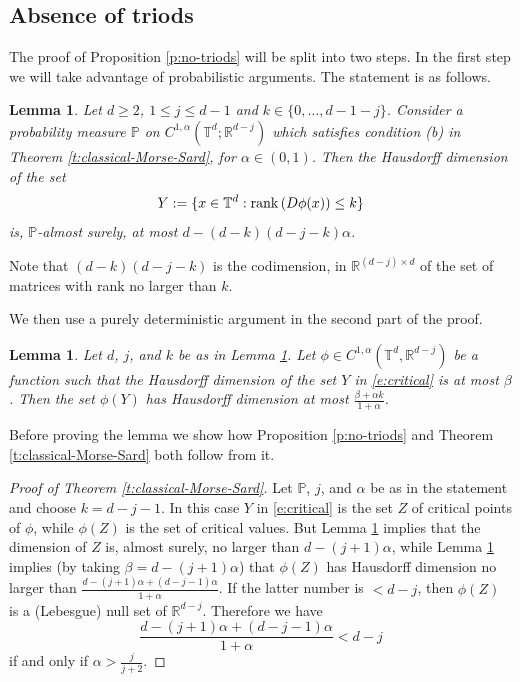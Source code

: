 \documentclass[11pt,reqno]{amsart}
\newtheorem{lemma}[theorem]{Lemma}
\theoremstyle{definition}
\numberwithin{equation}{section}
\begin{document}
\subsection{Absence of triods}\label{s:dimension-estimate}

The proof of Proposition \ref{p:no-triods} will be split into two steps. In the first step we will take advantage of  probabilistic arguments. The statement is as follows.

\begin{lemma}\label{l:probabilistic} Let $d\geq 2$, $1\leq j \leq d-1$ and $k\in \{0, \ldots , d-1-j\}$. 
Consider a probability measure $\mathbb P$ on $C^{1,\alpha} (\mathbb{T}^d; \mathbb{R}^{d-j})$ which satisfies condition (b) in Theorem \ref{t:classical-Morse-Sard}, for $\alpha \in (0,1)$. Then the Hausdorff dimension of the set 
\begin{equation}\label{e:critical}
Y := \{ x \in \mathbb{T}^d : {\rm rank}\, (D\phi (x)) \leq k\}
\end{equation}
is, $\mathbb P$-almost surely, at most $d-(d-k)(d-j-k)\alpha$.
\end{lemma}

Note that $(d-k)(d-j-k)$ is the codimension, in $\mathbb R^{(d-j)\times d}$ of the set of matrices with rank no larger than $k$.

We then use a purely deterministic argument in the second part of the proof.

\begin{lemma}\label{l:deterministic} Let $d$, $j$, and $k$ be as in Lemma \ref{l:probabilistic}.
Let $\phi \in C^{1,\alpha} (\mathbb T^d, \mathbb R^{d-j})$ be a function such that the Hausdorff dimension of 
the set $Y$ in \eqref{e:critical} is at most $\beta$. Then the set $\phi (Y)$ has Hausdorff dimension at most $\frac{\beta +\alpha k}{1+\alpha}$. 
\end{lemma}

Before proving the lemma we show how Proposition \ref{p:no-triods} and Theorem \ref{t:classical-Morse-Sard} both follow from it.

\begin{proof}[Proof of Theorem \ref{t:classical-Morse-Sard}]
Let $\mathbb P$, $j$, and $\alpha$ be as in the statement and 
choose $k=d-j-1$. In this case $Y$ in \eqref{e:critical} is the set $Z$ of critical points of $\phi$, while $\phi (Z)$ is the set of critical values. But Lemma \ref{l:probabilistic} implies that the dimension of $Z$ is, almost surely, no larger than $d-(j+1)\alpha$, while Lemma \ref{l:deterministic} implies (by taking $\beta = d - (j+1) \alpha$) that $\phi (Z)$ has Hausdorff dimension no larger than $\frac{d- (j+1)\alpha + (d-j-1)\alpha}{1+\alpha}$. If the latter number is $<d-j$, then $\phi (Z)$ is a (Lebesgue) null set of $\mathbb R^{d-j}$. Therefore we have 
\[
\frac{d-(j+1) \alpha + (d-j-1)\alpha}{1+\alpha} < d-j
\]
if and only if $\alpha > \frac{j}{j+2}$.
\end{proof}
\end{document}
